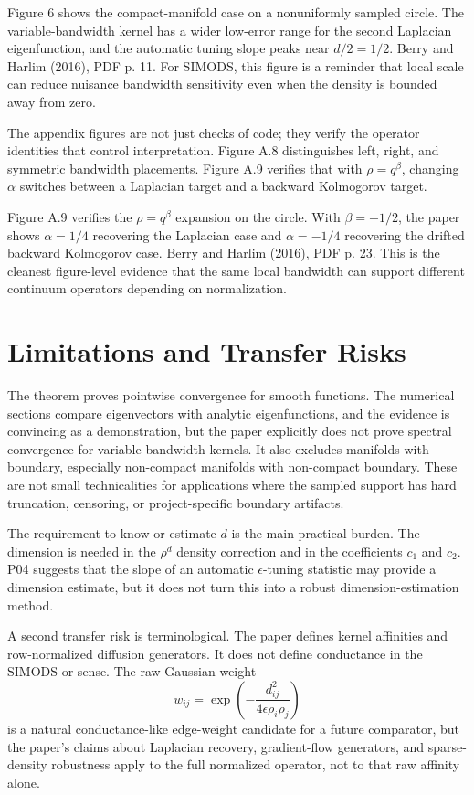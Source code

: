 \documentclass[11pt]{article}
\begin{document}
{Figure 6 shows the compact-manifold case on a nonuniformly sampled circle.  The
variable-bandwidth kernel has a wider low-error range for the second Laplacian
eigenfunction, and the automatic tuning slope peaks near \(d/2=1/2\).}
{Berry and Harlim (2016), PDF p. 11.}
{For SIMODS, this figure is a reminder that local scale can reduce nuisance
bandwidth sensitivity even when the density is bounded away from zero.}

The appendix figures are not just checks of code; they verify the operator
identities that control interpretation.  Figure A.8 distinguishes left, right,
and symmetric bandwidth placements.  Figure A.9 verifies that with
\(\rho=q^\beta\), changing \(\alpha\) switches between a Laplacian target and a
backward Kolmogorov target.

{Figure A.9 verifies the \(\rho=q^\beta\) expansion on the circle.  With
\(\beta=-1/2\), the paper shows \(\alpha=1/4\) recovering the Laplacian case
and \(\alpha=-1/4\) recovering the drifted backward Kolmogorov case.}
{Berry and Harlim (2016), PDF p. 23.}
{This is the cleanest figure-level evidence that the same local bandwidth can
support different continuum operators depending on normalization.}

\section{Limitations and Transfer Risks}

The theorem proves pointwise convergence for smooth functions.  The numerical
sections compare eigenvectors with analytic eigenfunctions, and the evidence is
convincing as a demonstration, but the paper explicitly does not prove spectral
convergence for variable-bandwidth kernels.  It also excludes manifolds with
boundary, especially non-compact manifolds with non-compact boundary.  These
are not small technicalities for applications where the sampled support has
hard truncation, censoring, or project-specific boundary artifacts.

The requirement to know or estimate \(d\) is the main practical burden.  The
dimension is needed in the \(\rho^d\) density correction and in the coefficients
\(c_1\) and \(c_2\).  P04 suggests that the slope of an automatic
\(\epsilon\)-tuning statistic may provide a dimension estimate, but it does not
turn this into a robust dimension-estimation method.

A second transfer risk is terminological.  The paper defines kernel affinities
and row-normalized diffusion generators.  It does not define conductance in the
SIMODS or  sense.  The raw Gaussian weight
\[
  w_{ij}=
  \exp\!\left(
    -\frac{d_{ij}^2}{4\epsilon\rho_i\rho_j}
  \right)
\]
is a natural conductance-like edge-weight candidate for a future comparator,
but the paper's claims about Laplacian recovery, gradient-flow generators, and
sparse-density robustness apply to the full normalized operator, not to that
raw affinity alone.
\end{document}
